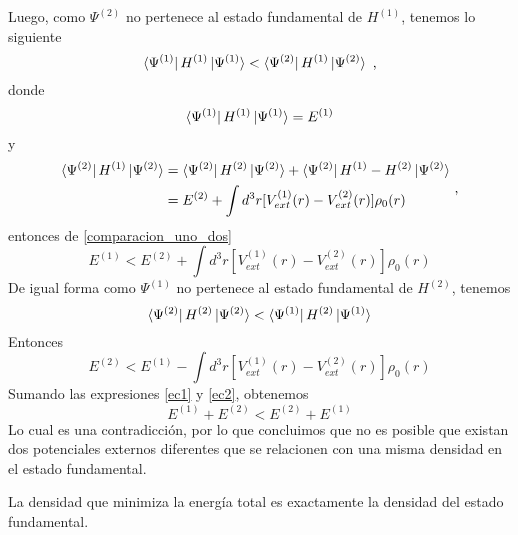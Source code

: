 \noindent Luego, como $\Psi ^{(2)}$ no pertenece al estado fundamental de 
$H^{(1)}$, 
tenemos lo siguiente
\begin{equation} \label{comparacion_uno_dos}
\bra{\Psi ^{(1)}} H^{(1)} \ket{\Psi ^{(1)}} < \bra{\Psi ^{(2)}} H^{(1)} 
\ket{\Psi ^{(2)}} \textrm{ ,}
\end{equation}
\noindent donde
\begin{equation}
\bra{\Psi ^{(1)}} H^{(1)} \ket{\Psi ^{(1)}} = E^{(1)}
\end{equation}
y
\begin{equation}
\begin{split}
\bra{\Psi ^{(2)}} H^{(1)} \ket{\Psi ^{(2)}} &= \bra{\Psi ^{(2)}} H^{(2)} 
\ket{\Psi ^{(2)}} + \bra{\Psi ^{(2)}} H^{(1)} - H^{(2)} \ket{\Psi ^{(2)}} \\
&= E^{(2)} + \int d^{3}r [ V_{ext}^{(1)}(r) - V_{ext}^{(2)}(r) ] \rho 
_{0}(r)
\end{split} \textrm{ ,}
\end{equation}
\noindent entonces de \ref{comparacion_uno_dos}
\begin{equation}
E^{(1)} < E^{(2)} + \int d^{3}r [ V_{ext}^{(1)}(r) - V_{ext}^{(2)}(r) ] 
\rho _{0}(r) \label{ec1}
\end{equation}
\noindent De igual forma como $\Psi ^{(1)}$ no pertenece al estado fundamental 
de 
$H^{(2)}$, tenemos
\[
\bra{\Psi ^{(2)}} H^{(2)} \ket{\Psi ^{(2)}} < \bra{\Psi ^{(1)}} H^{(2)} 
\ket{\Psi ^{(1)}}
\]
\noindent Entonces
\begin{equation}
E^{(2)} < E^{(1)} - \int d^{3}r [ V_{ext}^{(1)}(r) - V_{ext}^{(2)}(r) ] 
\rho _{0}(r) \label{ec2}
\end{equation} 
\noindent Sumando las expresiones \ref{ec1} y \ref{ec2}, obtenemos
\begin{equation}
E^{(1)} + E^{(2)} < E^{(2)} + E^{(1)}
\end{equation}
\noindent Lo cual es una contradicci\'on, por lo que concluimos que no es 
posible que 
existan dos potenciales externos diferentes que 
se relacionen con una misma densidad en el estado fundamental.


\begin{hk}
    La densidad que minimiza la energ\'ia total es exactamente la densidad del 
    estado fundamental.
\end{hk}

